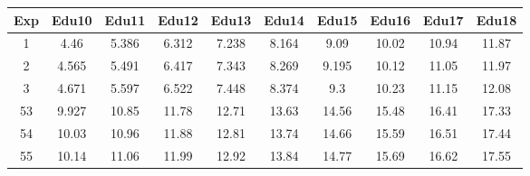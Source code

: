 \documentclass[]{article}
\newenvironment{Shaded}{\begin{snugshade}}{\end{snugshade}}
\newcommand{\KeywordTok}[1]{\textcolor[rgb]{0.13,0.29,0.53}{\textbf{#1}}}
\newcommand{\DataTypeTok}[1]{\textcolor[rgb]{0.13,0.29,0.53}{#1}}
\newcommand{\DecValTok}[1]{\textcolor[rgb]{0.00,0.00,0.81}{#1}}
\newcommand{\StringTok}[1]{\textcolor[rgb]{0.31,0.60,0.02}{#1}}
\newcommand{\OtherTok}[1]{\textcolor[rgb]{0.56,0.35,0.01}{#1}}
\newcommand{\OperatorTok}[1]{\textcolor[rgb]{0.81,0.36,0.00}{\textbf{#1}}}
\newcommand{\NormalTok}[1]{#1}
\begin{document}
\begin{longtable}[]{@{}cccccccccc@{}}
\toprule
Exp & Edu10 & Edu11 & Edu12 & Edu13 & Edu14 & Edu15 & Edu16 & Edu17 &
Edu18\tabularnewline
\midrule
\endhead
1 & 4.46 & 5.386 & 6.312 & 7.238 & 8.164 & 9.09 & 10.02 & 10.94 &
11.87\tabularnewline
2 & 4.565 & 5.491 & 6.417 & 7.343 & 8.269 & 9.195 & 10.12 & 11.05 &
11.97\tabularnewline
3 & 4.671 & 5.597 & 6.522 & 7.448 & 8.374 & 9.3 & 10.23 & 11.15 &
12.08\tabularnewline
53 & 9.927 & 10.85 & 11.78 & 12.71 & 13.63 & 14.56 & 15.48 & 16.41 &
17.33\tabularnewline
54 & 10.03 & 10.96 & 11.88 & 12.81 & 13.74 & 14.66 & 15.59 & 16.51 &
17.44\tabularnewline
55 & 10.14 & 11.06 & 11.99 & 12.92 & 13.84 & 14.77 & 15.69 & 16.62 &
17.55\tabularnewline
\bottomrule
\end{longtable}

\begin{Shaded}
\end{Shaded}
\end{document}
